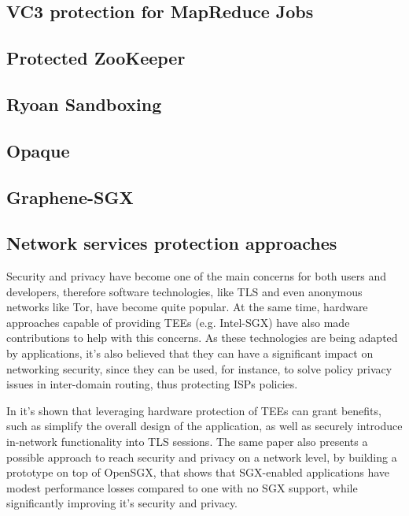 \subsection{VC3 protection for MapReduce Jobs}




\subsection{Protected ZooKeeper}


\subsection{Ryoan Sandboxing}




\subsection{Opaque}




\subsection{Graphene-SGX}


\subsection{Network services protection approaches}
\label{ssec:sgx_network_frameworks}

Security and privacy have become one of the main concerns for both users and developers, therefore software technologies, like TLS and even anonymous networks like Tor, have become quite popular. At the same time, hardware approaches capable of providing TEEs (e.g. Intel-SGX) have also made contributions to help with this concerns. 
As these technologies are being adapted by applications, it's also believed that they can have a significant impact on networking security, since they can be used, for instance, to solve policy privacy issues in inter-domain routing, thus protecting ISPs policies. 

In \cite{torSGXPaper} it's shown that leveraging hardware protection of TEEs can grant benefits, such as simplify the overall design of the application, as well as securely introduce in-network functionality into TLS sessions. 
The same paper also presents a possible approach to reach security and privacy on a network level, by building a prototype on top of OpenSGX, that shows that SGX-enabled applications have modest performance losses compared to one with no SGX support, while significantly improving it's security and privacy.

